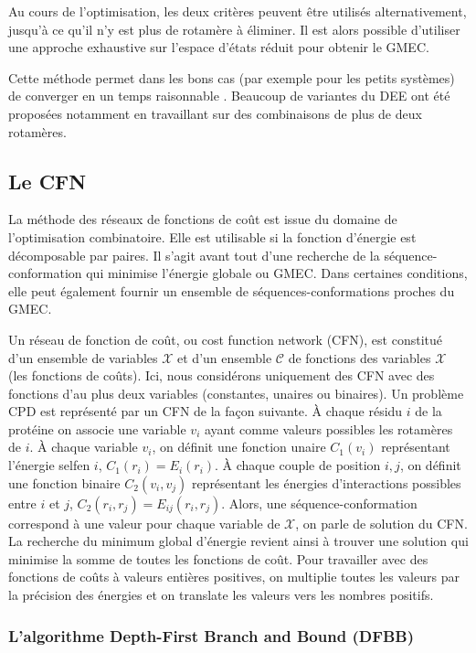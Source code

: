 Au cours de l'optimisation, les deux critères peuvent être utilisés alternativement, jusqu'à ce qu'il n'y est plus de rotamère à éliminer. Il est alors possible d'utiliser une approche exhaustive sur l'espace d'états réduit pour obtenir le GMEC.

Cette méthode permet dans les bons cas (par exemple pour les petits systèmes) de converger en un temps raisonnable \cite{Leach98}. Beaucoup de variantes du DEE \cite{Pierce00,Lilien05} ont été proposées notamment en travaillant sur des combinaisons de plus de deux rotamères.


\subsection{Le CFN}

La méthode des réseaux de fonctions de coût est issue du domaine de l'optimisation combinatoire. Elle est utilisable si la fonction d'énergie est décomposable par paires. Il s'agit avant tout d'une recherche de la séquence-conformation qui minimise l'énergie globale ou GMEC. Dans certaines conditions, elle peut également fournir un ensemble de séquences-conformations proches du GMEC.

Un réseau de fonction de coût, ou \og cost function network  \fg (CFN), est constitué d'un ensemble de variables $\mathcal{X}$ et d'un ensemble $\mathcal{C}$ de fonctions des variables $\mathcal{X}$ (les fonctions de coûts). Ici, nous considérons uniquement des CFN avec des fonctions d'au plus deux variables (constantes, unaires ou binaires). Un problème CPD est représenté par un CFN de la façon suivante. À chaque résidu $i$ de la protéine on associe une variable $v_i$ ayant comme valeurs possibles les rotamères de $i$. À chaque variable $v_i$, on définit une fonction unaire $C_1(v_i)$ représentant l'énergie \og self\fg en $i$, $C_1(r_i)=E_i(r_i)$. À chaque couple de position $i,j$, on définit une fonction binaire $C_2(v_i,v_j)$ représentant les énergies d'interactions possibles entre $i$ et $j$, $C_2(r_i,r_j)=E_{ij}(r_i,r_j)$. Alors, une séquence-conformation correspond à une valeur pour chaque variable de $\mathcal{X}$, on parle de solution du CFN. La recherche du minimum global d'énergie revient ainsi à trouver une solution qui minimise la somme de toutes les fonctions de coût. Pour travailler avec des fonctions de coûts à valeurs entières positives, on multiplie toutes les valeurs par la précision des énergies et on translate les valeurs vers les nombres positifs.
%
\subsubsection{L'algorithme \og Depth-First Branch and Bound \fg (DFBB)}

